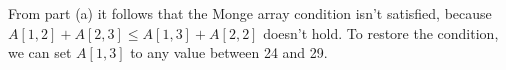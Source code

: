 From part (a) it follows that the Monge array condition isn't satisfied, because $A[1,2]+A[2,3]\le A[1,3]+A[2,2]$ doesn't hold.
To restore the condition, we can set $A[1,3]$ to any value between 24 and 29.
